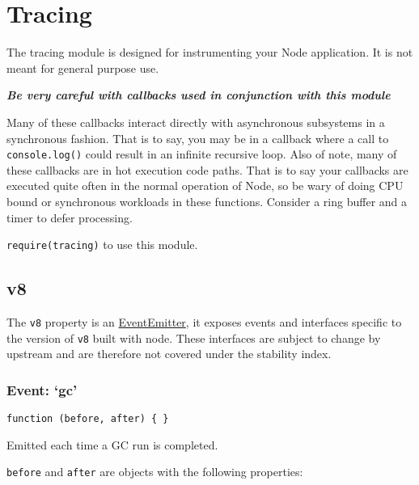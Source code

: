 \section{Tracing}\label{tracing}

\begin{Shaded}
\begin{Highlighting}[]
 
\end{Highlighting}
\end{Shaded}

The tracing module is designed for instrumenting your Node application.
It is not meant for general purpose use.

\textbf{\emph{Be very careful with callbacks used in conjunction with
this module}}

Many of these callbacks interact directly with asynchronous subsystems
in a synchronous fashion. That is to say, you may be in a callback where
a call to \texttt{console.log()} could result in an infinite recursive
loop. Also of note, many of these callbacks are in hot execution code
paths. That is to say your callbacks are executed quite often in the
normal operation of Node, so be wary of doing CPU bound or synchronous
workloads in these functions. Consider a ring buffer and a timer to
defer processing.

\texttt{require(\textquotesingle{}tracing\textquotesingle{})} to use
this module.

\subsection{v8}\label{v8}

The \texttt{v8} property is an
\href{events.html\#events_class_events_eventemitter}{EventEmitter}, it
exposes events and interfaces specific to the version of \texttt{v8}
built with node. These interfaces are subject to change by upstream and
are therefore not covered under the stability index.

\subsubsection{\texorpdfstring{Event: `gc'}{Event: gc}}\label{event-gc}

\texttt{function\ (before,\ after)\ \{\ \}}

Emitted each time a GC run is completed.

\texttt{before} and \texttt{after} are objects with the following
properties:

